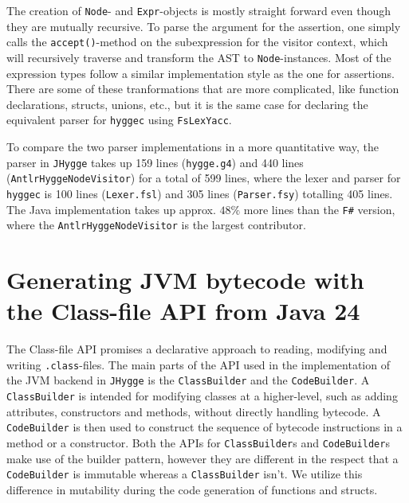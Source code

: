 The creation of \texttt{Node}- and \texttt{Expr}-objects is mostly straight forward even though they are mutually recursive.
To parse the argument for the assertion, one simply calls the \texttt{accept()}-method on the subexpression for the visitor
context, which will recursively traverse and transform the AST to \texttt{Node}-instances. Most of the expression types
follow a similar implementation style as the one for assertions. There are some of these tranformations that are more complicated,
like function declarations, structs, unions, etc., but it is the same case for declaring the equivalent parser for \texttt{hyggec}
using \texttt{FsLexYacc}.

To compare the two parser implementations in a more quantitative way, the parser in \texttt{JHygge}
takes up 159 lines (\texttt{hygge.g4}) and 440 lines (\texttt{AntlrHyggeNodeVisitor}) for a total of 599 lines, where the lexer and
parser for \texttt{hyggec} is 100 lines (\texttt{Lexer.fsl}) and 305 lines (\texttt{Parser.fsy}) totalling 405 lines. The Java
implementation takes up approx. $48\%$ more lines than the \texttt{F\#} version, where the \texttt{AntlrHyggeNodeVisitor} is
the largest contributor.

\section{Generating JVM bytecode with the Class-file API from Java 24}

The Class-file API promises a declarative approach to reading, modifying and writing \texttt{.class}-files. The main parts of the
API used in the implementation of the JVM backend in \texttt{JHygge} is the \texttt{ClassBuilder} and the \texttt{CodeBuilder}.
A \texttt{ClassBuilder} is intended for modifying classes at a higher-level, such as adding attributes, constructors and methods,
without directly handling bytecode. A \texttt{CodeBuilder} is then used to construct the sequence of bytecode instructions in
a method or a constructor. Both the APIs for \texttt{ClassBuilder}s and \texttt{CodeBuilder}s make use of the builder pattern,
however they are different in the respect that a \texttt{CodeBuilder} is immutable whereas a \texttt{ClassBuilder} isn't.
We utilize this difference in mutability during the code generation of functions and structs.

